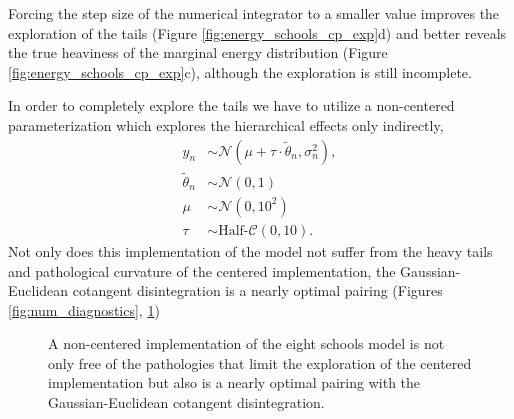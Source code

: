 \documentclass[stslayout]{imsart}
\begin{document}
Forcing the step size of the numerical integrator to a smaller value
improves the exploration of the tails (Figure \ref{fig:energy_schools_cp_exp}d)
and better reveals the true heaviness of the marginal energy distribution
(Figure \ref{fig:energy_schools_cp_exp}c), although the exploration
is still incomplete.

In order to completely explore the tails we have to utilize a non-centered
parameterization which explores the hierarchical effects only indirectly,
%
\begin{align*}
y_{n} &\sim 
\mathcal{N} \! \left( \mu + \tau \cdot \tilde{\theta}_{n}, \sigma_{n}^{2} \right),
\\
\tilde{\theta}_{n} &\sim \mathcal{N} \! \left( 0, 1 \right)
\\
\mu &\sim \mathcal{N} \! \left( 0, 10^{2} \right)
\\
\tau &\sim \text{Half-}\mathcal{C} \! \left( 0, 10 \right).
\end{align*}
%
Not only does this implementation of the model not suffer from the
heavy tails and pathological curvature of the centered implementation,
the Gaussian-Euclidean cotangent disintegration is a nearly optimal
pairing (Figures \ref{fig:num_diagnostics}, \ref{fig:energy_schools_ncp_exp})

\begin{figure}
\centering
{}
\caption{A non-centered implementation of the eight schools model is
not only free of the pathologies that limit the exploration of the centered
implementation but also is a nearly optimal pairing with the 
Gaussian-Euclidean cotangent disintegration.}
\label{fig:energy_schools_ncp_exp}
\end{figure}
\end{document}
